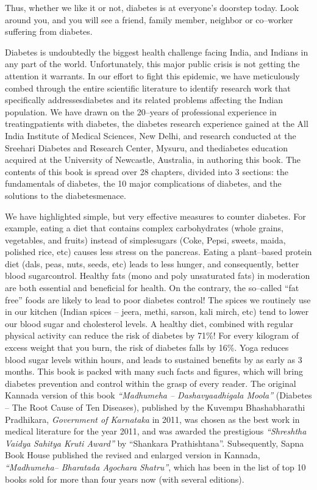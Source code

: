 Thus, whether we like it or not, diabetes is at everyone’s doorstep today. Look around you, and you will see a friend, family member, neighbor or co–worker suffering from diabetes.

Diabetes is undoubtedly the biggest health challenge facing India, and Indians in any part of the world. Unfortunately, this major public crisis is not getting the attention it warrants. In our effort to fight this epidemic, we have meticulously combed through the entire scienti\-fic literature to identify research work that specifically addresses\break diabetes and its related problems affecting the Indian population. We have drawn on the 20–years of professional experience in treating\break patients with diabetes, the diabetes research experience gained at the All India Institute of Medical Sciences, New Delhi, and research condu\-cted at the Sreehari Diabetes and Research Center, Mysuru, and the\break diabetes education acquired at the University of Newcastle, Australia, in authoring this book. The contents of this book is spread over 28 chapters, divided into 3 sections: the fundamentals of diabetes, the 10 major complications of diabetes, and the solutions to the diabetes\break menace.

We have highlighted simple, but very effective measures to cou\-nter diabetes. For example, eating a diet that contains complex carbohydrates (whole grains, vegetables, and fruits) instead of simple\break sugars (Coke, Pepsi, sweets, maida, polished rice, etc) causes less stress on the pancreas. Eating a plant–based protein diet (dals, peas, nuts, seeds, etc) leads to less hunger, and consequently, better blood sugar\break control. Healthy fats (mono and poly unsaturated fats) in moderation are both essential and beneficial for health. On the contrary, the so–called “fat free” foods are likely to lead to poor diabetes control! The spices we routinely use in our kitchen (Indian spices – jeera, methi, sarson, kali mirch, etc) tend to lower our blood sugar and choleste\-rol levels. A healthy diet, combined with regular physical activity can reduce the risk of diabetes by 71\%! For every kilogram of excess weight that you burn, the risk of diabetes falls by 16\%. Yoga reduces blood sugar levels within hours, and leads to sustained benefits by as early as 3 months. This book is packed with many such facts and figures, which will bring diabetes prevention and control within the grasp of every reader. The original Kannada version of this book \textit{“Madhumeha – Dashavyaadhigala Moola”} (Diabetes – The Root Cause of Ten Diseases), published by the Kuvempu Bhashabharathi Pradhikara, \textit{Government of Karnataka} in 2011, was chosen as the best work in medical literature for the year 2011, and was awarded the prestigious \textit{“Shreshtha Vaidya Sahitya Kruti Award”} by “Shankara Prathishtana”. Subsequently, Sapna Book House published the revised and enlarged version in Kannada, \textit{“Madhumeha– Bharatada Agochara Shatru”}, which has been in the list of top 10 books sold for more than four years now (with several editions).

